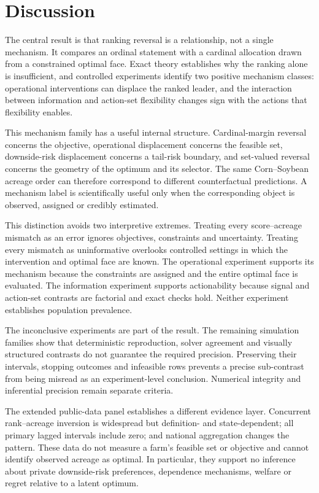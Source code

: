 \section{Discussion}

The central result is that ranking reversal is a relationship, not a single mechanism. It compares an ordinal statement with a cardinal allocation drawn from a constrained optimal face. Exact theory establishes why the ranking alone is insufficient, and controlled experiments identify two positive mechanism classes: operational interventions can displace the ranked leader, and the interaction between information and action-set flexibility changes sign with the actions that flexibility enables.

This mechanism family has a useful internal structure. Cardinal-margin reversal concerns the objective, operational displacement concerns the feasible set, downside-risk displacement concerns a tail-risk boundary, and set-valued reversal concerns the geometry of the optimum and its selector. The same Corn--Soybean acreage order can therefore correspond to different counterfactual predictions. A mechanism label is scientifically useful only when the corresponding object is observed, assigned or credibly estimated.

This distinction avoids two interpretive extremes. Treating every score--acreage mismatch as an error ignores objectives, constraints and uncertainty. Treating every mismatch as uninformative overlooks controlled settings in which the intervention and optimal face are known. The operational experiment supports its mechanism because the constraints are assigned and the entire optimal face is evaluated. The information experiment supports actionability because signal and action-set contrasts are factorial and exact checks hold. Neither experiment establishes population prevalence.

The inconclusive experiments are part of the result. The remaining simulation families show that deterministic reproduction, solver agreement and visually structured contrasts do not guarantee the required precision. Preserving their intervals, stopping outcomes and infeasible rows prevents a precise sub-contrast from being misread as an experiment-level conclusion. Numerical integrity and inferential precision remain separate criteria.

The extended public-data panel establishes a different evidence layer. Concurrent rank--acreage inversion is widespread but definition- and state-dependent; all primary lagged intervals include zero; and national aggregation changes the pattern. These data do not measure a farm's feasible set or objective and cannot identify observed acreage as optimal. In particular, they support no inference about private downside-risk preferences, dependence mechanisms, welfare or regret relative to a latent optimum.

